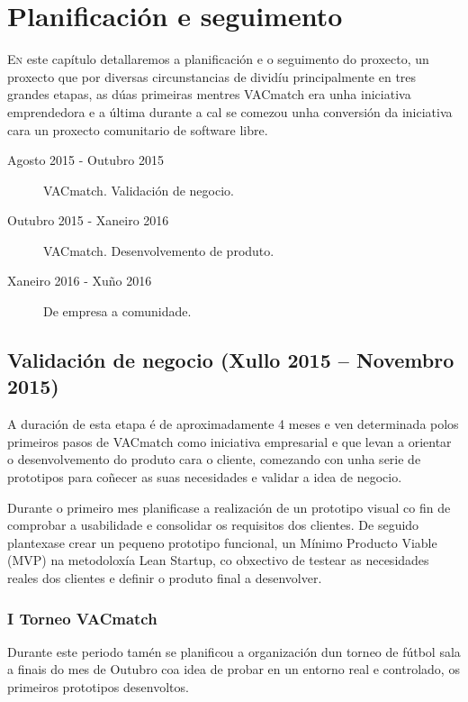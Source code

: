 \chapter{Planificación e seguimento}
\minitoc


  \lettrine{E}{n} este capítulo detallaremos a planificación e o seguimento do 
proxecto, un proxecto que por diversas circunstancias de dividíu principalmente 
en tres grandes etapas, as dúas primeiras mentres VACmatch era unha iniciativa 
emprendedora e a última durante a cal se comezou unha conversión da iniciativa 
cara un proxecto comunitario de software libre.

  \begin{description}
    \item [Agosto 2015 - Outubro 2015] VACmatch. Validación de negocio.
    \item [Outubro 2015 - Xaneiro 2016] VACmatch. Desenvolvemento de produto.
    \item [Xaneiro 2016 - Xuño 2016] De empresa a comunidade.
  \end{description}


  \section{Validación de negocio (Xullo 2015 -- Novembro 2015)}
  A duración de esta etapa é de aproximadamente 4 meses e ven determinada polos 
primeiros pasos de VACmatch como iniciativa empresarial e que levan a orientar 
o desenvolvemento do produto cara o cliente, comezando con unha serie de 
prototipos para coñecer as suas necesidades e validar a idea de 
negocio.

  Durante o primeiro mes planificase a realización de un prototipo visual co 
fin de comprobar a usabilidade e consolidar os requisitos dos clientes.
  De seguido plantexase crear un pequeno prototipo funcional, un Mínimo 
Producto Viable (MVP) na metodoloxía Lean Startup, co obxectivo de testear as 
necesidades reales dos clientes e definir o produto final a desenvolver.

    \subsection{I Torneo VACmatch}
    Durante este periodo tamén se planificou a organización dun torneo de 
fútbol sala a finais do mes de Outubro coa idea de probar en un entorno real 
e controlado, os primeiros prototipos desenvoltos.

